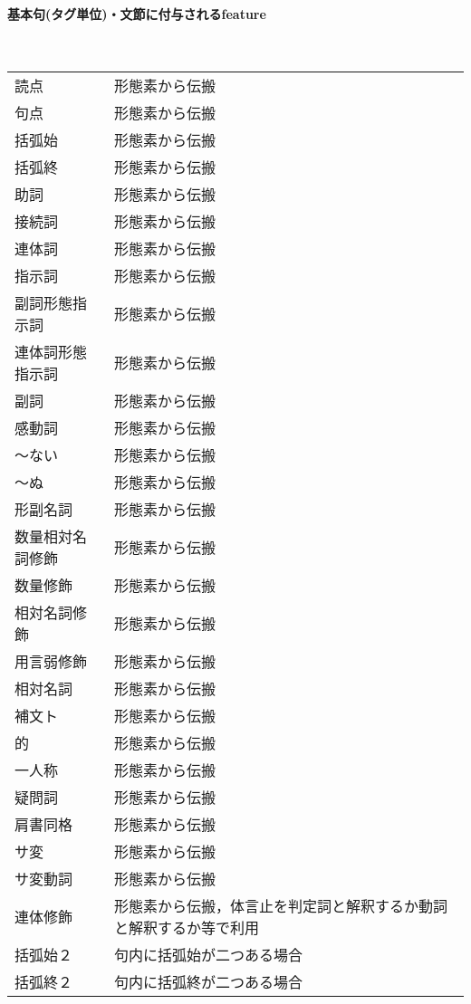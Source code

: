 \documentclass[a4j]{jarticle}
\begin{document}
\newpage

\paragraph{基本句(タグ単位)・文節に付与されるfeature} \ \\

\begin{supertabular}{p{4.2cm}p{9.6cm}}
読点 &   形態素から伝搬\\
句点 &   形態素から伝搬\\
括弧始 & 形態素から伝搬\\
括弧終 & 形態素から伝搬\\
助詞 &   形態素から伝搬\\
接続詞 & 形態素から伝搬\\
連体詞 & 形態素から伝搬\\
指示詞 & 形態素から伝搬\\
副詞形態指示詞 & 形態素から伝搬\\
連体詞形態指示詞 & 形態素から伝搬\\
副詞 &   形態素から伝搬\\
感動詞 & 形態素から伝搬\\
〜ない & 形態素から伝搬\\
〜ぬ &   形態素から伝搬\\
形副名詞 &   形態素から伝搬\\
数量相対名詞修飾 & 形態素から伝搬\\
数量修飾 &         形態素から伝搬\\
相対名詞修飾 &     形態素から伝搬\\
用言弱修飾 &       形態素から伝搬\\
相対名詞 &         形態素から伝搬\\
補文ト &           形態素から伝搬\\
的 &               形態素から伝搬\\
一人称 &	         形態素から伝搬\\
疑問詞 &	         形態素から伝搬\\
肩書同格 &         形態素から伝搬\\
サ変 &             形態素から伝搬\\
サ変動詞 &         形態素から伝搬\\
連体修飾 &         形態素から伝搬，体言止を判定詞と解釈するか動詞と解釈するか等で利用\\
括弧始２ & 句内に括弧始が二つある場合\\
括弧終２ & 句内に括弧終が二つある場合\\

\end{supertabular}
\end{document}
